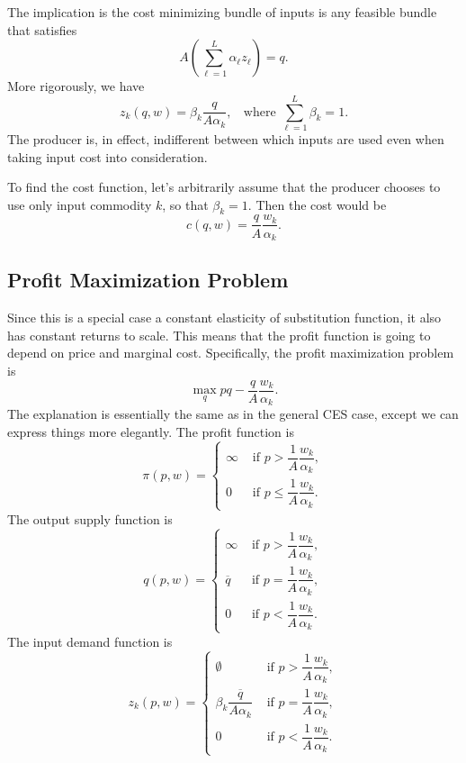 \documentclass[12pt]{article}
\theoremstyle{definition}
\begin{document}
	The implication is the cost minimizing bundle of inputs is any feasible bundle that satisfies
	\[A \left(\sum_{\ell = 1}^L \alpha_{\ell} z_{\ell} \right)=q.\]
More rigorously, we have
	\[z_k(q,w) = \beta_k \frac{q}{A \alpha_k}, \;\; \text{ where } \sum_{\ell=1}^L \beta_k = 1. \]
The producer is, in effect, indifferent between which inputs are used even when taking input cost into consideration. 
	
	To find the cost function, let's arbitrarily assume that the producer chooses to use only input commodity $k$, so that $\beta_k=1$. Then the cost would be
	\[c(q,w)= \frac{q}{A} \frac{ w_k}{ \alpha_k}.	\]

\subsection{Profit Maximization Problem} 
Since this is a special case a constant elasticity of substitution function, it also has constant returns to scale. This means that the profit function is going to depend on price and marginal cost. Specifically, the profit maximization problem is
	\[ \max_{q} pq -  \frac{q}{A} \frac{ w_k}{ \alpha_k}.	\]
The explanation is essentially the same as in the general CES case, except we can express things more elegantly. The profit function is
\[ \pi(p,w)=
\begin{cases}
	\infty		& \text{ if } p >  \dfrac{1}{A} \dfrac{ w_k}{ \alpha_k},\\[2ex]
	0		& \text{ if } p \leq  \dfrac{1}{A} \dfrac{ w_k}{ \alpha_k}.
\end{cases}
\]
The output supply function is
\[ q(p,w)=
\begin{cases}
	\infty		& \text{ if } p >  \dfrac{1}{A} \dfrac{ w_k}{ \alpha_k},\\[2ex]
	\overline{q}		& \text{ if } p =  \dfrac{1}{A} \dfrac{ w_k}{ \alpha_k},\\[2ex]
	0		& \text{ if } p <  \dfrac{1}{A} \dfrac{ w_k}{ \alpha_k}.
\end{cases}
\]
The input demand function is 
\[ z_k(p,w)=
\begin{cases}
	\emptyset		& \text{ if } p >  \dfrac{1}{A} \dfrac{ w_k}{ \alpha_k},\\[2ex]
	 \beta_k \dfrac{\overline{q}}{A \alpha_k}		& \text{ if } p =  \dfrac{1}{A} \dfrac{ w_k}{ \alpha_k},\\[2ex]
	0		& \text{ if } p <  \dfrac{1}{A} \dfrac{ w_k}{ \alpha_k}.
\end{cases}
\]
\end{document}
